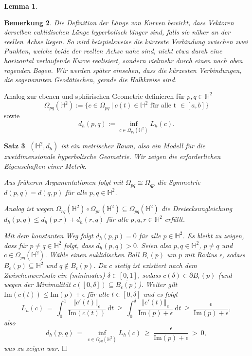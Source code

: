 \documentclass[11pt]{book}
\numberwithin{dummy}{section}
\newtheorem{theorem}{Satz}[section]
\newtheorem{lemma}[theorem]{Lemma}
\newtheorem{remark}[theorem]{Bemerkung}
\theoremstyle{nonumberbreak}
\newenvironment{pr}[1][]{\ifthenelse{\equal{#1}{}}{\proof}{\proof[#1]}\rm}{\endproof}
\newcommand{\He}{\mathbb{H}}
\begin{document}
\begin{spacing}{1.4}
\begin{lemma}
\end{lemma}


\begin{remark}
Die Definition der Länge von Kurven bewirkt, dass Vektoren derselben euklidischen Länge hyperbolisch länger sind, falls sie näher an der reellen Achse liegen. So wird beispielsweise die kürzeste Verbindung zwischen zwei Punkten, welche beide der reellen Achse nahe sind, nicht etwa durch eine horizontal verlaufende Kurve realisiert, sondern vielmehr durch einen nach oben ragenden Bogen. Wir werden später einsehen, dass die kürzesten Verbindungen, die sogenannten Geodätischen, gerade die Halbkreise sind.

\end{remark}

Analog zur ebenen und sphärischen Geometrie definieren für $p,q \in \He^2$
$$\Omega_{pq}(\He^2) := \{ c \in \Omega_{pq} \ \vert \ c(t) \in \He^2 \textrm{ für alle t } \in [a,b] \}$$
sowie 
$$d_h(p,q):= \inf_{c \in \Omega_{pq}(\He^2)} L_h(c).$$

\begin{theorem}    %
$(\He^2, d_h)$ ist ein metrischer Raum, also ein Modell für die zweidimensionale hyperbolische Geometrie.
\begin{pr}
Wir zeigen die erforderlichen Eigenschaften einer Metrik.
\begin{compactenum}
\item Aus früheren Argumentationen folgt mit $\Omega_{pq} \cong \Omega_{qp}$ die Symmetrie $d(p,q) = d(q,p)$ für alle $p,q \in \He^2$.
\item Analog ist wegen $\Omega_{rq}(\He^2) \circ \Omega_{pr}(\He^2) \subseteq \Omega_{pq}(\He^2)$ die Dreiecksungleichung $d_h(p,q) \leqslant d_h(p.r) + d_h(r,q)$ für alle $p,q,r \in \He^2$ erfüllt.
\item Mit dem konstanten Weg folgt $d_h(p,p)=0$ für alle $p \in \He^2$. Es bleibt zu zeigen, dass für $p \neq q \in \He^2$ folgt, dass $d_h(p,q) >0$. Seien also $p,q \in \He^2$, $p\neq q$ und $c \in \Omega_{pq}(\He^2)$. Wähle einen euklidischen Ball $B_{\epsilon}(p)$ um $p$ mit Radius $\epsilon$, sodass $B_{\epsilon}(p) \subseteq \He^2$ und $q \notin B_{\epsilon}(p)$. Da $c$ stetig ist existiert nach dem Zwischenwertsatz ein (minimales) $\delta \in [0,1]$, sodass $c(\delta) \in \partial B_{\epsilon}(p)$ (und wegen der Minimalität $c([0,\delta]) \subseteq \overline{B_{\epsilon}(p)}$). Weiter gilt $\mathrm{Im}(c(t)) \leqslant \mathrm{Im}(p) + \epsilon$ für alle $t \in [0,\delta]$ und es folgt
$$L_h(c) \  = \  \int_0^1 \frac{\Vert c'(t)\Vert_e}{\mathrm{Im}(c(t))} \ \mathrm{d}t \  \geqslant  \  \int_0^{\delta} \frac{\Vert c'(t)\Vert_e}{\mathrm{Im}(p) + \epsilon} \ \mathrm{d} t \ \geqslant \ \frac{\epsilon}{\mathrm{Im}(p) + \epsilon},$$
also $$d_h(p,q) \ =\ \inf_{c \in \Omega_{pq}(\He^2)} L_h(c) \ \geqslant\ \frac{\epsilon}{\mathrm{Im}(p) + \epsilon} \ >\ 0,$$
was zu zeigen war. $\hfill \Box$



\end{compactenum}
\end{pr}
\end{theorem}
\end{spacing}
\end{document}
